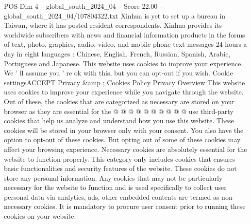 \begin{textsample}{POS Dim 4 – global\_south\_2024\_04 – Score 22.00 – global\_south\_2024\_04/107804322.txt}
Xinhua is yet to set up a bureau in Taiwan, where it has posted resident correspondents.
Xinhua provides its worldwide subscribers with news and financial information products in the forms of text, photo, graphics, audio, video, and mobile phone text messages 24 hours a day in eight languages : Chinese, English, French, Russian, Spanish, Arabic, Portuguese and Japanese.
This website uses cookies to improve your experience.
We ' ll assume you ' re ok with this, but you can opt-out if you wish.
Cookie settingsACCEPT Privacy \&amp ; Cookies Policy Privacy Overview This website uses cookies to improve your experience while you navigate through the website.
Out of these, the cookies that are categorized as necessary are stored on your browser as they are essential for the @ @ @ @ @ @ @ @ @ @ use third-party cookies that help us analyze and understand how you use this website.
These cookies will be stored in your browser only with your consent.
You also have the option to opt-out of these cookies.
But opting out of some of these cookies may affect your browsing experience.
Necessary cookies are absolutely essential for the website to function properly.
This category only includes cookies that ensures basic functionalities and security features of the website.
These cookies do not store any personal information.
Any cookies that may not be particularly necessary for the website to function and is used specifically to collect user personal data via analytics, ads, other embedded contents are termed as non-necessary cookies.
It is mandatory to procure user consent prior to running these cookies on your website.

\end{textsample}
